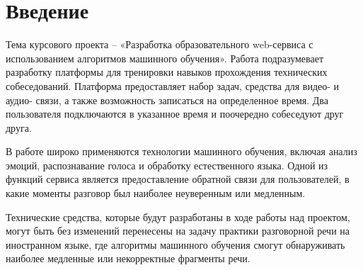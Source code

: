 \section*{Введение}
Тема курсового проекта – «Разработка образовательного web-сервиса с использованием алгоритмов машинного обучения». Работа подразумевает разработку платформы для тренировки навыков прохождения технических собеседований. Платформа предоставляет набор задач, средства для видео- и аудио- связи, а также возможность записаться на определенное время. Два пользователя подключаются в указанное время и поочередно собеседуют друг друга.

В работе широко применяются технологии машинного обучения, включая анализ эмоций, распознавание голоса и обработку естественного языка. Одной из функций сервиса является предоставление обратной связи для пользователей, в какие моменты разговор был наиболее неуверенным или медленным.

Технические средства, которые будут разработаны в ходе работы над проектом, могут быть без изменений перенесены на задачу практики разговорной речи на иностранном языке, где алгоритмы машинного обучения смогут обнаруживать наиболее медленные или некорректные фрагменты речи.

